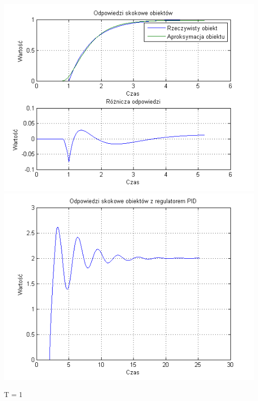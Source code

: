 \documentclass[10pt,a4paper]{article}
\begin{document}
\begin{center}
\includegraphics[scale=1]{images/dwa/skrypt_13.png}\\
\includegraphics[scale=1]{images/dwa/skrypt_14.png}\\
\end{center}
\newpage
T = 1
\end{document}
